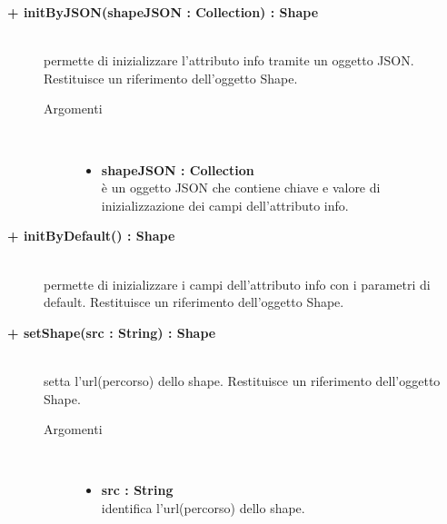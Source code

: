 \begin{description}
\begin{description}
\end{description}

\begin{description}
		\item[\textbf{\color{blue}+ initByJSON(shapeJSON : Collection) : Shape			}] \hfill \\
			permette di inizializzare l'attributo info tramite un oggetto JSON.  
			Restituisce un riferimento dell'oggetto Shape.
		\begin{description}
			\item[Argomenti] \hfill \\
				\begin{itemize}
				
					\item \textbf{shapeJSON : Collection			} \hfill \\
					è un oggetto JSON che contiene chiave e valore di inizializzazione dei campi dell'attributo info. 
				\end{itemize}
		\end{description}

\end{description}

\begin{description}
		\item[\textbf{\color{blue}+ initByDefault() : Shape			}] \hfill \\
			permette di inizializzare i campi dell'attributo info con i parametri di default. Restituisce un riferimento dell'oggetto Shape. 

\end{description}

\begin{description}
		\item[\textbf{\color{blue}+ setShape(src : String) : Shape			}] \hfill \\
			setta l'url(percorso) dello shape. Restituisce un riferimento dell'oggetto Shape.
			
		\begin{description}
			\item[Argomenti] \hfill \\
				\begin{itemize}
				
					\item \textbf{src : String			} \hfill \\
					identifica l'url(percorso) dello shape.
				\end{itemize}
		\end{description}


\end{description}
\end{description}
